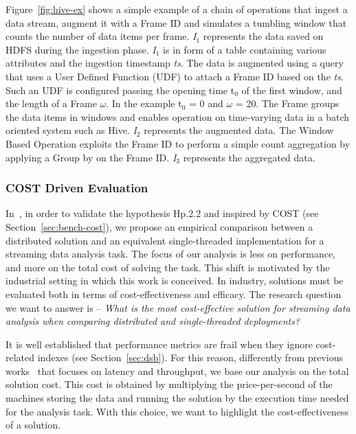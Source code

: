 {Figure~\ref{fig:hive-ex} shows a simple example of a chain of operations that ingest a data stream, augment it with a Frame ID and simulates a tumbling window that counts the number of data items per frame. \textit{I$_1$} represents the data saved on HDFS during the ingestion phase. \textit{I$_1$} is in form of a table containing various attributes and the ingestion timestamp \textit{ts}. The data is augmented using a query that uses a User Defined Function (UDF) to attach a Frame ID based on the \textit{ts}. Such an UDF is configured passing the opening time t$_0$ of the first window, and the length of a Frame  $\omega$. In the example t$_0$ = 0 and $\omega$ = 20. The Frame groups the data items in windows and enables operation on time-varying data in a batch oriented system such as Hive. \textit{I$_2$} represents the augmented data. The Window Based Operation exploits the Frame ID to perform a simple count aggregation by applying a Group by on the Frame ID.  \textit{I$_3$} represents the aggregated data.

\subsubsection{COST Driven Evaluation} \label{sec:comp-mod-eval-cost}
In~\cite{DBLP:conf/debs/BalduiniPV18}, in order to validate the hypothesis \textsf{Hp.2.2} and inspired by COST (see Section~\ref{sec:bench-cost}), we propose an empirical comparison between a distributed solution and an equivalent single-threaded implementation for a streaming data analysis task. The focus of our analysis is less on performance, and more on the total cost of solving the task. This shift is motivated by the industrial setting in which this work is conceived. In industry, solutions must be evaluated both in terms of cost-effectiveness and efficacy. The research question we want to answer is -- \textit{What is the most cost-effective solution for streaming data analysis when comparing distributed and single-threaded deployments?}

It is well established that performance metrics are frail when they ignore cost-related indexes (see Section~\ref{sec:dsb}). For this reason, differently from previous works~\cite{arasu2004linear,chintapalli2016benchmarking} that focuses on latency and throughput, we base our analysis on the total solution cost. This cost is obtained by multiplying the price-per-second of the machines storing the data and running the solution by the execution time needed for the analysis task. With this choice, we want to highlight the cost-effectiveness of a solution.

}
